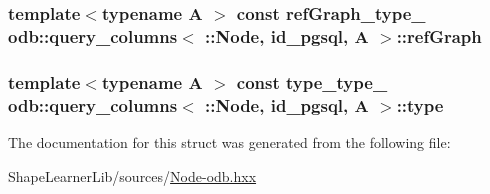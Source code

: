 \subsubsection[{ref\+Graph}]{\setlength{\rightskip}{0pt plus 5cm}template$<$typename A $>$ const ref\+Graph\+\_\+type\+\_\+ odb\+::query\+\_\+columns$<$ \+::{\bf Node}, id\+\_\+pgsql, A $>$\+::ref\+Graph\hspace{0.3cm}{\ttfamily [static]}}\label{structodb_1_1query__columns_3_01_1_1_node_00_01id__pgsql_00_01_a_01_4_a6a2bbc7cc9adb0c0285cb31932708b37}
\hypertarget{structodb_1_1query__columns_3_01_1_1_node_00_01id__pgsql_00_01_a_01_4_a42e9413de6ee8d1dab25c319c9dadb49}{}
\subsubsection[{type}]{\setlength{\rightskip}{0pt plus 5cm}template$<$typename A $>$ const {\bf type\+\_\+type\+\_\+} odb\+::query\+\_\+columns$<$ \+::{\bf Node}, id\+\_\+pgsql, A $>$\+::type\hspace{0.3cm}{\ttfamily [static]}}\label{structodb_1_1query__columns_3_01_1_1_node_00_01id__pgsql_00_01_a_01_4_a42e9413de6ee8d1dab25c319c9dadb49}


The documentation for this struct was generated from the following file\+:\begin{DoxyCompactItemize}
\item 
Shape\+Learner\+Lib/sources/\hyperlink{_node-odb_8hxx}{Node-\/odb.\+hxx}\end{DoxyCompactItemize}

